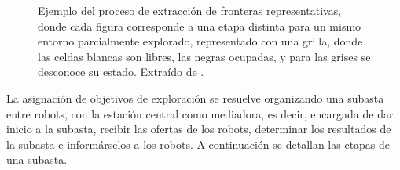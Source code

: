 \begin{figure}[H]
  \centering
  \qquad
  \qquad

  \caption{Ejemplo del proceso de extracción de fronteras representativas, donde cada figura corresponde a una etapa distinta para un mismo entorno parcialmente explorado, representado con una grilla, donde las celdas blancas son libres, las negras ocupadas, y para las grises se desconoce su estado. Extraído de \cite{Amorin2019}.}\label{fig:ejemploFrontSig}
\end{figure}

La asignación de objetivos de exploración se resuelve organizando una subasta entre robots, con la estación central como mediadora, es decir, encargada de dar inicio a la subasta, recibir las ofertas de los robots, determinar los resultados de la subasta e informárselos a los robots. A continuación se detallan las etapas de una subasta.

